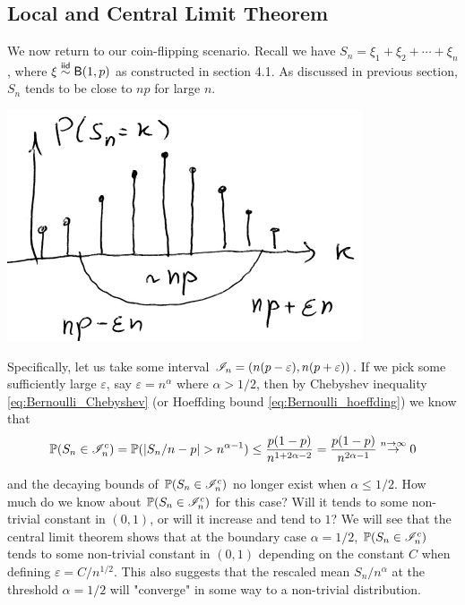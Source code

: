 \subsection{Local and Central Limit Theorem}
We now return to our coin-flipping scenario. Recall we have $S_n = \xi_1 + \xi_2 + \cdots + \xi_n$, where $\xi \overset{\mathsf{iid}}\sim \mathsf{B}(1,p)$ as constructed in section 4.1. As discussed in previous section, $S_n$ tends to be close to $np$ for large $n$. 
\begin{center}
    \includegraphics[scale=0.8]{sa.png}
\end{center}

Specifically, let us take some interval $\mathcal{I}_n = (n(p-\varepsilon), n(p+\varepsilon))$. If we pick some sufficiently large $\varepsilon$, say $\varepsilon = n^{\alpha}$ where $\alpha > 1/2$, then by Chebyshev inequality  \eqref{eq:Bernoulli_Chebyshev} (or Hoeffding bound \eqref{eq:Bernoulli_hoeffding}) we know that
\begin{equation} \label{eq:binomial_concentration}
\mathbb{P}(S_n \in \mathcal{I}_n^c) = \mathbb{P}(|S_n/n - p| > n^{\alpha - 1}) \leq \frac{p(1-p)}{n^{1+2\alpha - 2}} = \frac{p(1-p)}{n^{2\alpha - 1}} \overset{n \to \infty}{\to} 0
\end{equation}

and the decaying bounds of $\mathbb{P}(S_n \in \mathcal{I}_n^c)$ no longer exist when $\alpha \leq 1/2$. How much do we know about $\mathbb{P}(S_n \in \mathcal{I}_n^c)$ for this case? Will it tends to some non-trivial constant in $(0,1)$, or will it increase and tend to $1$? We will see that the central limit theorem shows that at the boundary case $\alpha = 1/2$, $\mathbb{P}(S_n \in \mathcal{I}_n^c)$ tends to some non-trivial constant in $(0,1)$ depending on the constant $C$ when defining $\varepsilon = C/n^{1/2}$. This also suggests that the rescaled mean $S_n/n^\alpha$ at the threshold $\alpha = 1/2$ will "converge" in some way to a non-trivial distribution.

